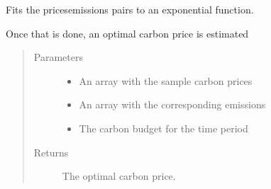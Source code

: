 \documentclass[letterpaper,10pt,english]{sphinxmanual}
\begin{document}
\begin{fulllineitems}
\label{\detokenize{api:muse.carbon_budget.exponential}}
Fits the prices\sphinxhyphen{}emissions pairs to an exponential function.

Once that is done, an optimal carbon price is estimated
\begin{quote}\begin{description}
\item[{Parameters}] \leavevmode\begin{itemize}
\item {} 
 \textendash{} An array with the sample carbon prices

\item {} 
 \textendash{} An array with the corresponding emissions

\item {} 
 \textendash{} The carbon budget for the time period

\end{itemize}

\item[{Returns}] \leavevmode
The optimal carbon price.

\end{description}\end{quote}

\end{fulllineitems}

\end{document}
